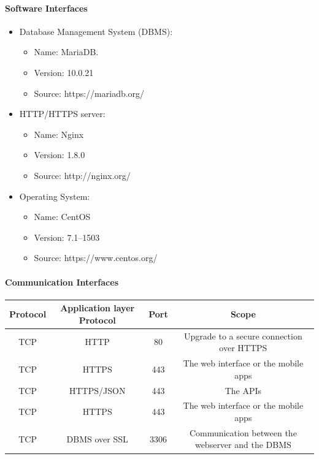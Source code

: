 \documentclass{article}
\begin{document}
\paragraph{Software Interfaces}
\begin{itemize}
	\item Database Management System (DBMS):
		\begin{itemize}
			\item Name: MariaDB.\@
			\item Version: 10.0.21
			\item Source: https://mariadb.org/
		\end{itemize}
	\item HTTP/HTTPS server:
		\begin{itemize}
			\item Name: Nginx
			\item Version: 1.8.0 
			\item Source: http://nginx.org/
		\end{itemize}
	\item Operating System:
		\begin{itemize}
			\item Name: CentOS
			\item Version: 7.1--1503 
			\item Source: https://www.centos.org/ 
		\end{itemize}
\end{itemize}
\paragraph{Communication Interfaces}
\begin{center}
	\begin{tabular}{*{4}{c}}
	\toprule
    Protocol & Application layer Protocol & Port & Scope \\
	\midrule
	TCP & HTTP & 80 & Upgrade to a secure connection over HTTPS \\ 
    TCP & HTTPS & 443 & The web interface or the mobile apps \\ 
    TCP & HTTPS/JSON & 443 & The APIs \\ 
    TCP & HTTPS & 443 & The web interface or the mobile apps \\ 
    TCP & DBMS over SSL & 3306 & Communication between the webserver and the DBMS \\ 
    \bottomrule
    \end{tabular}
\end{center}
\end{document}

